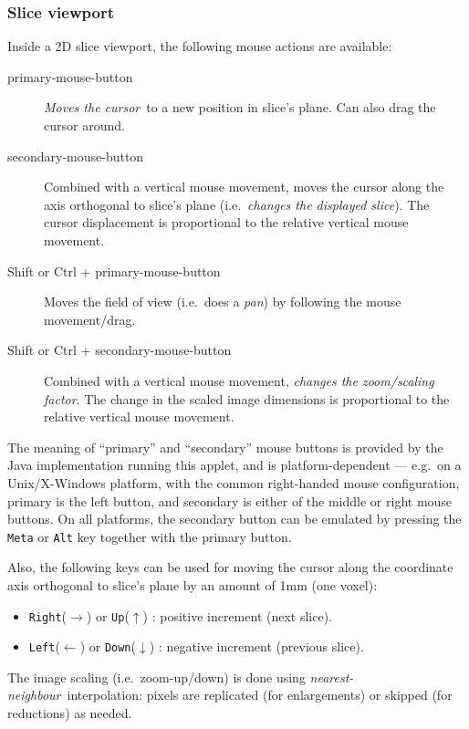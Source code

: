 \subsubsection{Slice viewport}

Inside a 2D slice viewport, the following mouse actions are available:
\begin{description}
\item[primary-mouse-button] {\em Moves the cursor}\ to a new position
  in slice's plane. Can also drag the cursor around.
\item[secondary-mouse-button] Combined with a vertical mouse movement,
  moves the cursor along the axis orthogonal to slice's plane
  (i.e.\ {\em changes the displayed slice}). The cursor displacement
  is proportional to the relative vertical mouse movement.
\item[Shift or Ctrl + primary-mouse-button] Moves the field of view
  (i.e.\ does a {\em pan}) by following the mouse movement/drag.
\item[Shift or Ctrl + secondary-mouse-button] Combined with a vertical
  mouse movement, {\em changes the zoom/scaling factor}.  The change
  in the scaled image dimensions is proportional to the relative
  vertical mouse movement.
\end{description}
The meaning of ``primary'' and ``secondary'' mouse buttons is provided
by the Java implementation running this applet, and is
platform-dependent --- e.g.\ on a Unix/X-Windows platform, with the
common right-handed mouse configuration, primary is the left button,
and secondary is either of the middle or right mouse buttons.  On all
platforms, the secondary button can be emulated by pressing the
\verb+Meta+ or \verb+Alt+ key together with the primary button.

Also, the following keys can be used for moving the cursor along the
coordinate axis orthogonal to slice's plane by an amount of 1mm
(one voxel):
\begin{itemize}
\item \verb+Right+($\rightarrow$) or \verb+Up+($\uparrow$) : positive
  increment (next slice).
\item \verb+Left+($\leftarrow$) or \verb+Down+($\downarrow$) :
  negative increment (previous slice).
\end{itemize}

The image scaling (i.e.\ zoom-up/down) is done using {\em
  nearest-neighbour}\ interpolation: pixels are replicated (for
enlargements) or skipped (for reductions) as needed.

